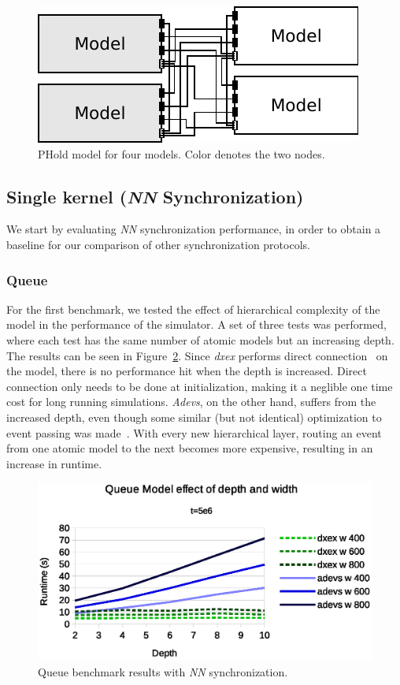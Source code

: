 \begin{figure}
    \center
	\includegraphics[width=\modelfraction\columnwidth]{fig/phold_model.pdf}
	\caption{PHold model for four models. Color denotes the two nodes.}
	\label{fig:PHold_model}
\end{figure}

\subsection{Single kernel (\textit{NN} Synchronization)}
We start by evaluating \textit{NN} synchronization performance, in order to obtain a baseline for our comparison of other synchronization protocols.

\subsubsection{Queue}
\label{4-seq-Queue}
For the first benchmark, we tested the effect of hierarchical complexity of the model in the performance of the simulator.
A set of three tests was performed, where each test has the same number of atomic models but an increasing depth.
The results can be seen in Figure~\ref{fig:Queue_benchmark_seq}.
Since \textit{dxex} performs direct connection~\cite{SymbolicFlattening} on the model, there is no performance hit when the depth is increased.
Direct connection only needs to be done at initialization, making it a neglible one time cost for long running simulations.
\textit{Adevs}, on the other hand, suffers from the increased depth, even though some similar (but not identical) optimization to event passing was made~\cite{adevs_opt}.
With every new hierarchical layer, routing an event from one atomic model to the next becomes more expensive, resulting in an increase in runtime.

\begin{figure}
	\center
	\includegraphics[width=\columnwidth]{fig/queue_fixed_sequential.eps}
	\caption{Queue benchmark results with \textit{NN} synchronization.}
	\label{fig:Queue_benchmark_seq}
\end{figure}

